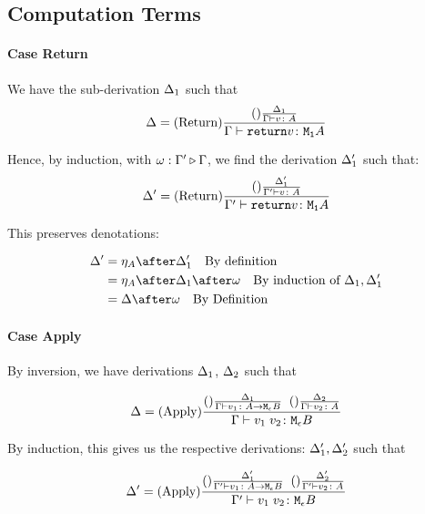 \documentclass{report}
\begin{document}
    \subsection{Computation Terms}
    \paragraph{Case Return}
    We have the sub-derivation $\Delta_1$ such that
    \begin{equation}
        \Delta = (\text{Return}) \frac{(\text{}) \frac{\Delta_1}{\Gamma \vdash v \colon A}}{\Gamma \vdash \texttt{return} v \colon \texttt{M}_{\texttt{1}}{A}}
    \end{equation}

    Hence, by induction, with $\omega : \Gamma' \triangleright \Gamma$, we find the derivation $\Delta_1'$ such that:
    \begin{equation}
        \Delta' = (\text{Return}) \frac{(\text{}) \frac{\Delta_1'}{\Gamma' \vdash v \colon A}}{\Gamma' \vdash \texttt{return} v \colon \texttt{M}_{\texttt{1}}{A}}
    \end{equation}

    This preserves denotations:

    \begin{align}
        \D' & = \point{A}\after\D_1' \qt{By definition}\\
            & = \point{A}\after\D_1\after\w\qt{By induction of $\D_1, \D_1'$}\\
            & = \D\after\w\qt{By Definition}
    \end{align}

    \paragraph{Case Apply}
        By inversion, we have derivations $\Delta_1$, $\Delta_2$ such that

        \begin{equation}
            \Delta = 
            (\text{Apply}) \frac{
                (\text{}) \frac{\Delta_1}{\Gamma \vdash v_1 \colon A \rightarrow \texttt{M}_{\epsilon}{B}}
                \;\;
                (\text{}) \frac{\Delta_2}{\Gamma \vdash v_2 \colon A}
            }{
                \Gamma \vdash v_1\; v_2 \colon \texttt{M}_{\epsilon}{B}
            }
        \end{equation}

        By induction, this gives us the respective derivations: $\Delta_1',\Delta_2'$ such that

        
        \begin{equation}
            \Delta' = 
            (\text{Apply}) \frac{
                (\text{}) \frac{\Delta_1'}{\Gamma' \vdash v_1 \colon A \rightarrow \texttt{M}_{\epsilon}{B}}
                \;\;
                (\text{}) \frac{\Delta_2'}{\Gamma' \vdash v_2 \colon A}
            }{
                \Gamma' \vdash v_1\; v_2 \colon \texttt{M}_{\epsilon}{B}
            }
        \end{equation}
\end{document}
